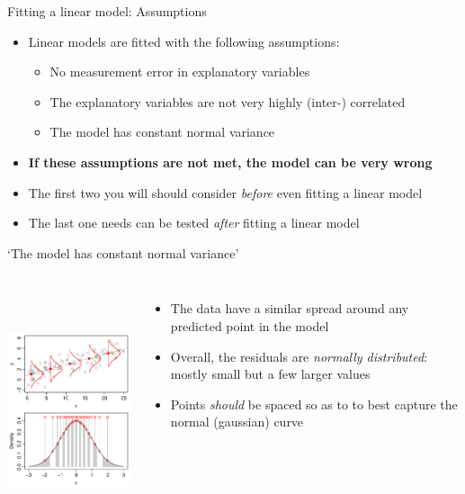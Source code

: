 \documentclass[xcolor=x11names,compress]{beamer}
\renewcommand{\(}{\begin{columns}}
\renewcommand{\)}{\end{columns}}
\newcommand{\<}[1]{\begin{column}{#1}}
\renewcommand{\>}{\end{column}}
\begin{document}

\begin{frame}{Fitting a linear model: Assumptions}

\begin{itemize}\itemsep20pt
\item Linear models are fitted with the following assumptions:
\begin{itemize}
\item No measurement error in explanatory variables
\item The explanatory variables are not very highly (inter-) correlated
\item {} The model has constant normal variance
\end{itemize}
\item {\bf If these assumptions are not met, the model can be very wrong}
\item The first two you will should consider {\it before} even fitting a linear model
\item<2> The last one needs can be tested {\it after} fitting a linear model
\end{itemize}

\end{frame}


\begin{frame}{`The model has constant normal variance'}
\begin{columns}[T]

		\includegraphics[height=72mm]{ResidDemo.pdf}
		
		\begin{itemize}
		\item The data have a similar spread around any predicted point in the model
		\vspace{2cm}
		\item Overall, the residuals are {\it normally distributed}: mostly small but a few larger values
        \item Points {\it should} be spaced so as to to best capture the normal (gaussian) curve
		\end{itemize}
		
\end{columns}
\end{frame}
\end{document}
